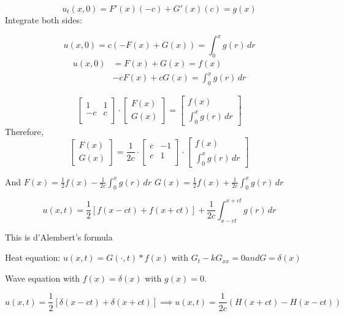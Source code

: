 \documentclass[main.tex]{subfiles}
\begin{document}
$$u_t(x, 0) = F'(x)(-c) + G'(x)(c) = g(x)$$
Integrate both sides:

$$u(x, 0) = c(-F(x) + G(x)) = \int_0^x g(r)\,dr$$
\begin{align}
u(x, 0) &= F(x) + G(x) = f(x) \\
        &-cF(x) + cG(x) = \int_0^x g(r)\,dr
\end{align}

$$
\left[\begin{array}{ll}
1 & 1 \\
-c & c \\
\end{array}\right]\cdot
\left[\begin{array}{ll}
F(x) \\
G(x)
\end{array}\right]
=
\left[
\begin{array}{ll}
f(x) \\
\int_0^x g(r)\, dr
\end{array}
\right]
$$
Therefore,
$$
\left[\begin{array}{ll}
F(x) \\
G(x)
\end{array}\right] = \frac{1}{2c}\cdot \left[\begin{array}{ll}
c & -1 \\
c & 1 \\
\end{array}\right]\cdot \left[\begin{array}{ll}
f(x) \\
\int_0^x g(r)\, dr
\end{array}\right]
$$

And $F(x) = \frac{1}{2} f(x) - \frac{1}{2c}\int_0^x g(r)\,dr$
$G(x) = \frac{1}{2} f(x) + \frac{1}{2c}\int_0^x g(r)\,dr$

$$u(x, t) = \frac{1}{2}\left[f(x-ct) + f(x+ct)\right] + \frac{1}{2c}\int_{x-ct}^{x+ct} g(r)\,dr$$

This is d'Alembert's formula

Heat equation: $u(x, t) = G(\cdot, t)* f(x)$ with $G_t - kG_{xx} = 0 and G = \delta(x)$

Wave equation with $f(x) = \delta(x)$ with $g(x) = 0$.

$$u(x, t) = \frac{1}{2}\left[\delta(x-ct) + \delta(x + ct)\right] \implies u(x, t) = \frac{1}{2c}(H(x + ct) - H(x - ct))$$
\end{document}
